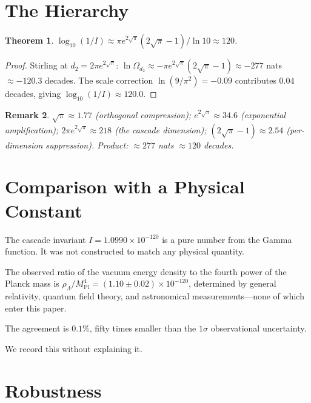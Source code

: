 \documentclass[11pt,a4paper]{article}
\newtheorem{theorem}{Theorem}[section]
\newtheorem{remark}[theorem]{Remark}
\begin{document}
\section{The Hierarchy}

\begin{theorem}\label{thm:hierarchy}
$\log_{10}(1/I)\approx
\pi e^{2\sqrt{\pi}}(2\sqrt{\pi}-1)/\ln 10\approx 120$.
\end{theorem}

\begin{proof}
Stirling at $d_2 = 2\pi e^{2\sqrt{\pi}}$:
$\ln\Omega_{d_2}\approx -\pi e^{2\sqrt{\pi}}(2\sqrt{\pi}-1)
\approx -277$ nats $\approx -120.3$ decades. The scale correction
$\ln(9/\pi^2) = -0.09$ contributes $0.04$ decades, giving
$\log_{10}(1/I) \approx 120.0$.
\end{proof}

\begin{remark}
$\sqrt{\pi}\approx 1.77$ (orthogonal compression);\;
$e^{2\sqrt{\pi}}\approx 34.6$ (exponential amplification);\;
$2\pi e^{2\sqrt{\pi}}\approx 218$ (the cascade dimension);\;
$(2\sqrt{\pi}-1)\approx 2.54$ (per-dimension suppression).\;
Product: $\approx 277$ nats $\approx 120$ decades.
\end{remark}

\section{Comparison with a Physical Constant}

The cascade invariant $I = 1.0990\times 10^{-120}$ is a pure number from
the Gamma function. It was not constructed to match any physical quantity.

The observed ratio of the vacuum energy density to the fourth power of the
Planck mass is
$\rho_\Lambda/M^4_{\mathrm{Pl}} = (1.10\pm 0.02)\times 10^{-120}$,
determined by general relativity, quantum field theory, and astronomical
measurements---none of which enter this paper.

The agreement is $0.1\%$, fifty times smaller than the $1\sigma$
observational uncertainty.

We record this without explaining it.

\section{Robustness}
\end{document}
